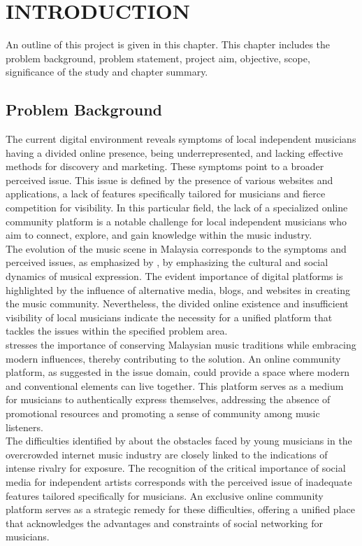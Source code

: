 \chapter{INTRODUCTION}
\label{ch:intro}
An outline of this project is given in this chapter. This chapter includes the problem background, problem statement, project aim, objective, scope, significance of the study and chapter summary.

\section{Problem Background}
The current digital environment reveals symptoms of local independent musicians having a divided online presence, being underrepresented, and lacking effective methods for discovery and marketing. These symptoms point to a broader perceived issue. This issue is defined by the presence of various websites and applications, a lack of features specifically tailored for musicians and fierce competition for visibility. In this particular field, the lack of a specialized online community platform is a notable challenge for local independent musicians who aim to connect, explore, and gain knowledge within the music industry. \\

The evolution of the music scene in Malaysia corresponds to the symptoms and perceived issues, as emphasized by \textcite{ong19}, by emphasizing the cultural and social dynamics of musical expression. The evident importance of digital platforms is highlighted by the influence of alternative media, blogs, and websites in creating the music community. Nevertheless, the divided online existence and insufficient visibility of local musicians indicate the necessity for a unified platform that tackles the issues within the specified problem area. \\

\textcite{mohd21} stresses the importance of conserving Malaysian music traditions while embracing modern influences, thereby contributing to the solution. An online community platform, as suggested in the issue domain, could provide a space where modern and conventional elements can live together. This platform serves as a medium for musicians to authentically express themselves, addressing the absence of promotional resources and promoting a sense of community among music listeners. \\

The difficulties identified by \textcite{haynes18} about the obstacles faced by young musicians in the overcrowded internet music industry are closely linked to the indications of intense rivalry for exposure. The recognition of the critical importance of social media for independent artists corresponds with the perceived issue of inadequate features tailored specifically for musicians. An exclusive online community platform serves as a strategic remedy for these difficulties, offering a unified place that acknowledges the advantages and constraints of social networking for musicians. \\

